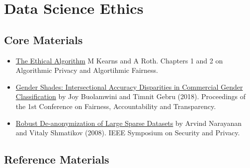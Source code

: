 \documentclass[
  12pt,
]{book}
\begin{document}
\hypertarget{data-science-ethics}{%
\section{Data Science Ethics}\label{data-science-ethics}}

\hypertarget{core-materials-4}{%
\subsection*{Core Materials}\label{core-materials-4}}

\begin{itemize}
\item
  \href{https://library-search.imperial.ac.uk/discovery/fulldisplay?docid=alma991000531083101591\&context=L\&vid=44IMP_INST:ICL_VU1\&lang=en\&search_scope=MyInst_and_CI\&adaptor=Local\%20Search\%20Engine\&tab=Everything\&query=any,contains,kearns\%20and\%20roth\&mode=Basic}{The Ethical Algorithm} M Kearns and A Roth. Chapters 1 and 2 on Algorithmic Privacy and Algortihmic Fairness.
\item
  \href{https://proceedings.mlr.press/v81/buolamwini18a.html}{Gender Shades: Intersectional Accuracy Disparities in Commercial Gender Classification} by Joy Buolamwini and Timnit Gebru (2018). Proceedings of the 1st Conference on Fairness, Accountability and Transparency.
\item
  \href{https://ieeexplore.ieee.org/document/4531148}{Robust De-anonymization of Large Sparse Datasets} by Arvind Narayanan and Vitaly Shmatikov (2008). IEEE Symposium on Security and Privacy.
\end{itemize}

\hypertarget{reference-materials-3}{%
\subsection*{Reference Materials}\label{reference-materials-3}}
\end{document}
